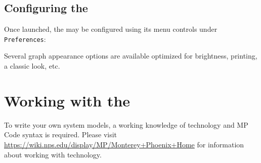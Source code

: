 \documentclass[11pt,fleqn]{article} %
\begin{document}
\subsection{Configuring the \ggui}
Once launched, the \ggui may be configured using its menu controls under \verb+Preferences+:
\begin{compactitem}
\item Several graph appearance options are available optimized for brightness, printing, a classic look, etc.\\
\end{compactitem}


\section{Working with the \ggui}
To write your own system models, a working knowledge of \mphoenix technology and MP Code syntax is required. Please visit \url{https://wiki.nps.edu/display/MP/Monterey+Phoenix+Home} for information about working with \mphoenix technology.
\end{document}
